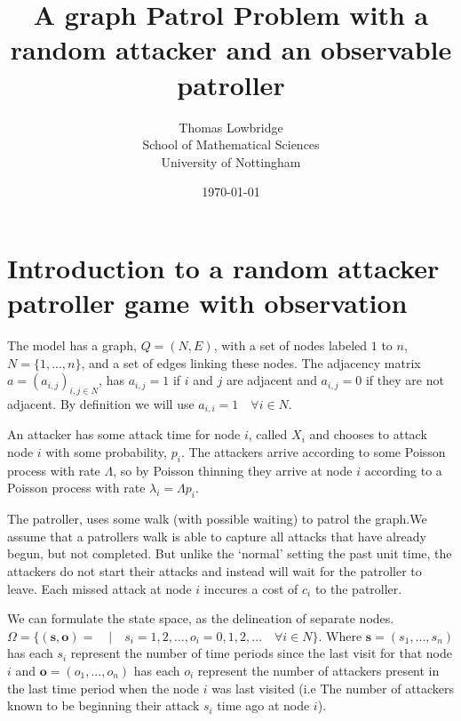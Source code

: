 \documentclass[a4paper,10pt]{article}
\title{A graph Patrol Problem with a random attacker and an observable patroller}
\date{\today}
\author{Thomas Lowbridge \\ School of Mathematical Sciences \\ University of Nottingham}
\theoremstyle{definition}
\theoremstyle{definition}
\theoremstyle{remark}
\theoremstyle{definition}
\begin{document}
\pagestyle{empty}
{
  \renewcommand{\thispagestyle}[1]{}
  \maketitle
  \tableofcontents  
}
\clearpage
\pagestyle{plain}


\setlength{\parindent}{0pt}
\setlength{\parskip}{1em}

\newpage
{}
\section{Introduction to a random attacker patroller game with observation}
The model has a graph, $Q=(N,E)$, with a set of nodes labeled $1$ to $n$, $N=\{1,...,n \}$, and a set of edges linking these nodes. The adjacency matrix $a=(a_{i,j})_{i,j \in N}$, has $a_{i,j}=1$ if $i$ and $j$ are adjacent and $a_{i,j}=0$ if they are not adjacent. By definition we will use $a_{i,i}=1 \quad \forall i \in N$.


An attacker has some attack time for node $i$, called $X_{i}$ and chooses to attack node $i$ with some probability, $p_{i}$. The attackers arrive according to some Poisson process with rate $\Lambda$, so by Poisson thinning they arrive at node $i$ according to a Poisson process with rate $\lambda_{i}=\Lambda p_{i}$.

The patroller, uses some walk (with possible waiting) to patrol the graph.We assume that a patrollers walk is able to capture all attacks that have already begun, but not completed. But unlike the `normal' setting the past unit time, the attackers do not start their attacks and instead will wait for the patroller to leave. Each missed attack at node $i$ inccures a cost of $c_{i}$ to the patroller.

We can formulate the state space, as the delineation of separate nodes. $\Omega= \{ (\bm{s},\bm{o})= \quad | \quad s_{i}=1,2,... , o_{i}=0,1,2,... \quad \forall i \in N \}$. Where $\bm{s}=(s_{1},...,s_{n})$ has each $s_{i}$ represent the number of time periods since the last visit for that node $i$ and $\bm{o}=(o_{1},...,o_{n})$ has each $o_{i}$ represent the number of attackers present in the last time period when the node $i$ was last visited (i.e The number of attackers known to be beginning their attack $s_{i}$ time ago at node $i$).
\end{document}
